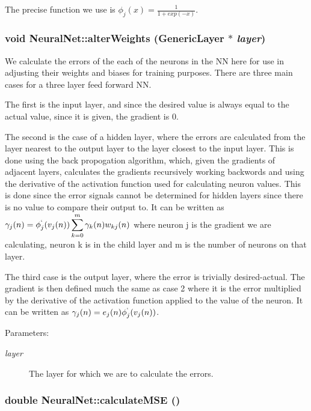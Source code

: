 The precise function we use is $\displaystyle\phi_j(x) = \frac{1}{1 + exp(-x)}$. \hypertarget{classNeuralNet_ec1f7f481954c7a3eafdefc8d23070f8}{
\subsubsection{\setlength{\rightskip}{0pt plus 5cm}void NeuralNet::alterWeights ({\bf GenericLayer} $\ast$ {\em layer})}}
\label{classNeuralNet_ec1f7f481954c7a3eafdefc8d23070f8}


We calculate the errors of the each of the neurons in the NN here for use in adjusting their weights and biases for training purposes. There are three main cases for a three layer feed forward NN.

The first is the input layer, and since the desired value is always equal to the actual value, since it is given, the gradient is 0.

The second is the case of a hidden layer, where the errors are calculated from the layer nearest to the output layer to the layer closest to the input layer. This is done using the back propogation algorithm, which, given the gradients of adjacent layers, calculates the gradients recursively working backwords and using the derivative of the activation function used for calculating neuron values. This is done since the error signals cannot be determined for hidden layers since there is no value to compare their output to. It can be written as $\displaystyle\gamma_j(n) = \phi_j^`(v_j(n))\sum_{k=0}^m \gamma_k(n)w_{kj}(n)$ where neuron j is the gradient we are calculating, neuron k is in the child layer and m is the number of neurons on that layer.

The third case is the output layer, where the error is trivially desired-actual. The gradient is then defined much the same as case 2 where it is the error multiplied by the derivative of the activation function applied to the value of the neuron. It can be written as $\displaystyle\gamma_j(n) = e_j(n)\phi_j^`(v_j(n))$.

\begin{Desc}
\item[Parameters:]
\begin{description}
\item[{\em layer}]The layer for which we are to calculate the errors. \end{description}
\end{Desc}
\hypertarget{classNeuralNet_ae5a77ddecea2c9f0c11feb0089dbb03}{
\subsubsection{\setlength{\rightskip}{0pt plus 5cm}double NeuralNet::calculateMSE ()}}
\label{classNeuralNet_ae5a77ddecea2c9f0c11feb0089dbb03}


